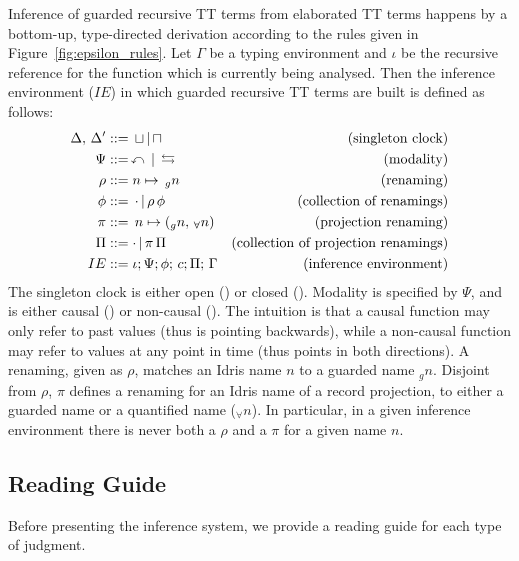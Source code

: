 
Inference of guarded recursive TT terms from elaborated TT terms happens by a
bottom-up, type-directed derivation according to the rules given in
Figure~\ref{fig:epsilon_rules}. Let $\Gamma$ be a typing environment and $\iota$ be the recursive
reference for the function which is currently being analysed. Then the inference
environment ($IE$) in which guarded recursive TT terms are built is defined as follows:
\begin{align*}
   \Delta,\,\Delta^\prime &::=\,\sqcup\,|\,\sqcap & \text{(singleton clock)} \\
   \Psi &::=\,\curvearrowleft\,|\,\leftrightarrows & \text{(modality)} \\
   \rho &::= n \mapsto \,_gn & \text{(renaming)} \\
   \phi &::=\,\cdot\,|\,\rho\,\phi & \text{(collection of renamings)} \\
   \pi &::= \,n \mapsto (_gn,\, _{\forall}n) & \text{(projection renaming)} \\
   \Pi &::= \cdot\,|\,\pi \,\Pi & \text{(collection of projection renamings)} \\
   IE &::= \iota;\Psi;\phi;\,c;\Pi;\,\Gamma & \text{(inference environment)}
\end{align*}
The singleton clock is either open (\open) or closed (\closed). Modality is
specified by $\Psi$, and is either causal (\causal) or non-causal
(\noncausal). The intuition is that a causal function may only refer to past
values (thus \causal{} is pointing backwards), while a non-causal function may
refer to values at any point in time (thus \noncausal{} points in both
directions). A renaming, given as $\rho$, matches an Idris name $n$ to a guarded
name $_gn$. Disjoint from $\rho$, $\pi$ defines a renaming for an Idris name of
a record projection, to either a guarded name or a quantified name
($_{\forall}n$). In particular, in a given inference environment there is never
both a $\rho$ and a $\pi$ for a given name $n$.

\subsection{Reading Guide}
Before presenting the inference system, we provide a reading guide for each type
of judgment. 

